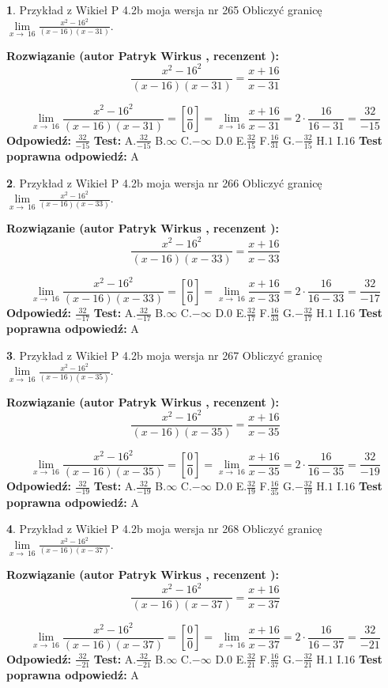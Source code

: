 \documentclass[12pt, a4paper]{article}
\theoremstyle{definition} %
\newtheorem{zad}{}
\newcommand{\zadStart}[1]{\begin{zad}#1\newline}
\newcommand{\zadStop}{\end{zad}}
\newcommand{\rozwStart}[2]{\noindent \textbf{Rozwiązanie (autor #1 , recenzent #2): }\newline}
\newcommand{\rozwStop}{\newline}
\newcommand{\odpStart}{\noindent \textbf{Odpowiedź:}\newline}
\newcommand{\odpStop}{\newline}
\newcommand{\testStart}{\noindent \textbf{Test:}\newline}
\newcommand{\testStop}{\newline}
\newcommand{\kluczStart}{\noindent \textbf{Test poprawna odpowiedź:}\newline}
\newcommand{\kluczStop}{\newline}
\begin{document}
\zadStart{Przykład z Wikieł P 4.2b moja wersja nr 265}
Obliczyć granicę $\lim\limits_{x\to\ 16}\frac{x^{2}-16^{2}}{(x-16)(x-31)}$.
\zadStop
\rozwStart{Patryk Wirkus}{}
$$\frac{x^{2}-16^{2}}{(x-16)(x-31)}=\frac{x+16}{x-31}$$

$$\lim\limits_{x\to\ 16}\frac{x^{2}-16^{2}}{(x-16)(x-31)}=[\frac{0}{0}]=\lim\limits_{x\to\ 16}\frac{x+16}{x-31}=2 \cdot \frac{16}{16-31} = \frac{32}{-15}$$
\rozwStop
\odpStart
$\frac{32}{-15}$
\odpStop
\testStart
A.$\frac{32}{-15}$
B.$\infty$
C.$-\infty$
D.$0$
E.$\frac{32}{15}$
F.$\frac{16}{31}$
G.$-\frac{32}{15}$
H.$1$
I.$16$
\testStop
\kluczStart
A
\kluczStop



\zadStart{Przykład z Wikieł P 4.2b moja wersja nr 266}
Obliczyć granicę $\lim\limits_{x\to\ 16}\frac{x^{2}-16^{2}}{(x-16)(x-33)}$.
\zadStop
\rozwStart{Patryk Wirkus}{}
$$\frac{x^{2}-16^{2}}{(x-16)(x-33)}=\frac{x+16}{x-33}$$

$$\lim\limits_{x\to\ 16}\frac{x^{2}-16^{2}}{(x-16)(x-33)}=[\frac{0}{0}]=\lim\limits_{x\to\ 16}\frac{x+16}{x-33}=2 \cdot \frac{16}{16-33} = \frac{32}{-17}$$
\rozwStop
\odpStart
$\frac{32}{-17}$
\odpStop
\testStart
A.$\frac{32}{-17}$
B.$\infty$
C.$-\infty$
D.$0$
E.$\frac{32}{17}$
F.$\frac{16}{33}$
G.$-\frac{32}{17}$
H.$1$
I.$16$
\testStop
\kluczStart
A
\kluczStop



\zadStart{Przykład z Wikieł P 4.2b moja wersja nr 267}
Obliczyć granicę $\lim\limits_{x\to\ 16}\frac{x^{2}-16^{2}}{(x-16)(x-35)}$.
\zadStop
\rozwStart{Patryk Wirkus}{}
$$\frac{x^{2}-16^{2}}{(x-16)(x-35)}=\frac{x+16}{x-35}$$

$$\lim\limits_{x\to\ 16}\frac{x^{2}-16^{2}}{(x-16)(x-35)}=[\frac{0}{0}]=\lim\limits_{x\to\ 16}\frac{x+16}{x-35}=2 \cdot \frac{16}{16-35} = \frac{32}{-19}$$
\rozwStop
\odpStart
$\frac{32}{-19}$
\odpStop
\testStart
A.$\frac{32}{-19}$
B.$\infty$
C.$-\infty$
D.$0$
E.$\frac{32}{19}$
F.$\frac{16}{35}$
G.$-\frac{32}{19}$
H.$1$
I.$16$
\testStop
\kluczStart
A
\kluczStop



\zadStart{Przykład z Wikieł P 4.2b moja wersja nr 268}
Obliczyć granicę $\lim\limits_{x\to\ 16}\frac{x^{2}-16^{2}}{(x-16)(x-37)}$.
\zadStop
\rozwStart{Patryk Wirkus}{}
$$\frac{x^{2}-16^{2}}{(x-16)(x-37)}=\frac{x+16}{x-37}$$

$$\lim\limits_{x\to\ 16}\frac{x^{2}-16^{2}}{(x-16)(x-37)}=[\frac{0}{0}]=\lim\limits_{x\to\ 16}\frac{x+16}{x-37}=2 \cdot \frac{16}{16-37} = \frac{32}{-21}$$
\rozwStop
\odpStart
$\frac{32}{-21}$
\odpStop
\testStart
A.$\frac{32}{-21}$
B.$\infty$
C.$-\infty$
D.$0$
E.$\frac{32}{21}$
F.$\frac{16}{37}$
G.$-\frac{32}{21}$
H.$1$
I.$16$
\testStop
\kluczStart
A
\kluczStop
\end{document}
